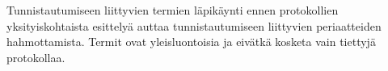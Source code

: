 Tunnistautumiseen liittyvien termien läpikäynti ennen protokollien yksityiskohtaista esittelyä auttaa tunnistautumiseen liittyvien periaatteiden hahmottamista. Termit ovat yleisluontoisia ja eivätkä kosketa vain tiettyjä protokollaa.